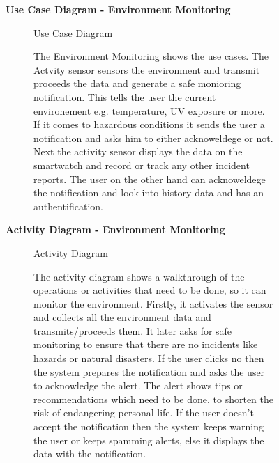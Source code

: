 \documentclass{article}
\begin{document}
		\clearpage
	\begin{figure}[htbp]
		\textbf{Use Case Diagram - Environment Monitoring}
		\centering
		\begin{subfigure}{\textwidth}
			\resizebox{\textwidth}{!}{}
			\caption{Use Case Diagram}
		\end{subfigure}
		\begin{subfigure}{\textwidth}
			The Environment Monitoring shows the use cases. The Actvity sensor sensors the environment and transmit
			proceeds the data and generate a safe monioring notification. This tells the user the current environement e.g.
			temperature, UV exposure or more. If it comes to hazardous conditions it sends the user a notification and asks him 
			to either acknoweldege or not. Next the activity sensor displays the data on the smartwatch and record or
			track any other incident reports. The user on the other hand can acknoweldege the notification and look into
			history data and has an authentification. 
		\end{subfigure}
	\end{figure}
	\clearpage

	\begin{figure}[htbp]
		\textbf{Activity Diagram - Environment Monitoring}
		\centering
		\begin{subfigure}{\textwidth}
			\resizebox{\textwidth}{!}{}
			\caption{Activity Diagram}
		\end{subfigure}
		\begin{subfigure}{\textwidth}
			The activity diagram shows a walkthrough of the operations or activities that need to be done, 
			so it can monitor the environment. Firstly, it activates the sensor and collects all the environment 
			data and transmits/proceeds them. It later asks for safe monitoring to ensure that there are no incidents 
			like hazards or natural disasters. If the user clicks no then the system prepares the notification and 
			asks the user to acknowledge the alert. The alert shows tips or recommendations which need to be done, to 
			shorten the risk of endangering personal life. If the user doesn’t accept the notification then the system 
			keeps warning the user or keeps spamming alerts, else it displays the data with the notification.
		\end{subfigure}
	\end{figure}
	
\end{document}
